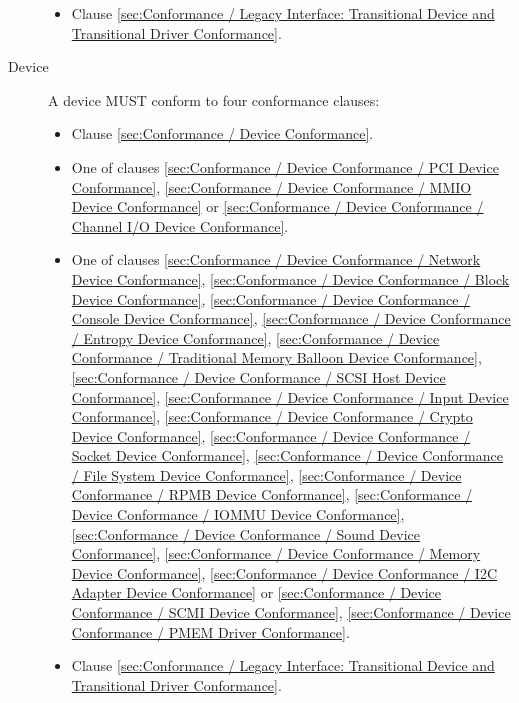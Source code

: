 \begin{description}
\begin{itemize}
    \item Clause \ref{sec:Conformance / Legacy Interface: Transitional Device and Transitional Driver Conformance}.
  \end{itemize}
\item[Device] A device MUST conform to four conformance clauses:
  \begin{itemize}
    \item Clause \ref{sec:Conformance / Device Conformance}.
    \item One of clauses \ref{sec:Conformance / Device Conformance / PCI Device Conformance}, \ref{sec:Conformance / Device Conformance / MMIO Device Conformance} or \ref{sec:Conformance / Device Conformance / Channel I/O Device Conformance}.
    \item One of clauses 
\ref{sec:Conformance / Device Conformance / Network Device Conformance}, 
\ref{sec:Conformance / Device Conformance / Block Device Conformance}, 
\ref{sec:Conformance / Device Conformance / Console Device Conformance}, 
\ref{sec:Conformance / Device Conformance / Entropy Device Conformance}, 
\ref{sec:Conformance / Device Conformance / Traditional Memory Balloon Device Conformance}, 
\ref{sec:Conformance / Device Conformance / SCSI Host Device Conformance}, 
\ref{sec:Conformance / Device Conformance / Input Device Conformance}, 
\ref{sec:Conformance / Device Conformance / Crypto Device Conformance}, 
\ref{sec:Conformance / Device Conformance / Socket Device Conformance}, 
\ref{sec:Conformance / Device Conformance / File System Device Conformance},
\ref{sec:Conformance / Device Conformance / RPMB Device Conformance},
\ref{sec:Conformance / Device Conformance / IOMMU Device Conformance},
\ref{sec:Conformance / Device Conformance / Sound Device Conformance},
\ref{sec:Conformance / Device Conformance / Memory Device Conformance},
\ref{sec:Conformance / Device Conformance / I2C Adapter Device Conformance} or
\ref{sec:Conformance / Device Conformance / SCMI Device Conformance},
\ref{sec:Conformance / Device Conformance / PMEM Driver Conformance}.

    \item Clause \ref{sec:Conformance / Legacy Interface: Transitional Device and Transitional Driver Conformance}.
  \end{itemize}
\end{description}

\label{sec:Conformance / Driver Conformance}

